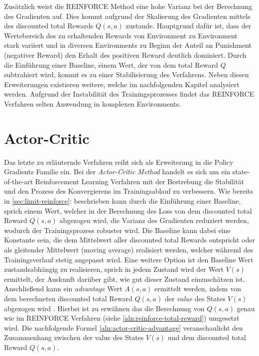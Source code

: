 \documentclass[11pt]{scrartcl}
\begin{document}
Zusätzlich weist die REINFORCE Method eine hohe Varianz bei der Berechnung des Gradienten auf.
Dies kommt aufgrund der Skalierung des Gradienten mittels des discounted total Rewards $Q(s,a)$ zustande.
Hauptgrund dafür ist, dass der Wertebereich des zu erhaltenden Rewards von Environment zu Environment
stark variiert und in diversen Environments zu Beginn der Anteil an Punishment (negativer Reward) den
Erhalt des positiven Reward deutlich dominiert. Durch die Einführung einer Baseline, einem Wert, der
von dem total Reward $Q$ subtrahiert wird, kommt es zu einer Stabilisierung des Verfahrens. Neben
diesen Erweiterungen existieren weitere, welche im nachfolgenden Kapitel analysiert werden. Aufgrund
der Instabilität des Trainingsprozesses findet das REINFORCE Verfahren selten Anwendung in komplexen
Environments.   
\newpage


\section{Actor-Critic}
Das letzte zu erläuternde Verfahren reiht sich als Erweiterung in die Policy Gradients Familie ein.
Bei der \textit{Actor-Critic Method} handelt es sich um ein state-of-the-art Reinforcement Learning
Verfahren mit der Bestrebung die Stabilität und den Prozess des Konvergierens im Trainingsablauf
zu verbessern. Wie bereits in \autoref{sec:limit-reinforce}:  beschrieben
kann durch die Einführung einer Baseline, sprich einem Wert, welcher in der Berechnung des Loss von dem
discounted total Reward $Q(s,a)$ abgezogen wird, die Varianz des Gradienten reduziert werden, wodurch
der Trainingsprozess robuster wird. Die Baseline kann dabei eine Konstante sein, die dem Mittelwert 
aller discounted total Rewards entspricht oder als gleitender Mittelwert (moving average) realisiert
werden, welcher während des Trainingsverlauf stetig angepasst wird. Eine weitere Option ist den Baseline
Wert zustandsabhängig zu realisieren, sprich in jedem Zustand wird der Wert $V(s)$ ermittelt, der Auskunft
darüber gibt, wie gut dieser Zustand einzuschätzen ist. Anschließend kann ein \textit{advantage} Wert
$A(s,a)$ ermittelt werden, indem von dem berechneten discounted total Reward $Q(s,a)$ der \textit{value}
des States $V(s)$ abgezogen wird \cite[~S.268 ff.]{L2018}. Hierbei ist zu erwähnen das die Berechnung von
$Q(s,a)$ genau wie im REINFORCE Verfahren (siehe \autoref{aln:reinforce-total-reward}) umgesetzt wird.
Die nachfolgende Formel \ref{aln:actor-critic-advantage} veranschaulicht den Zusammenhang zwischen der
value des States $V(s)$ und dem discounted total Reward $Q(s,a)$.
\end{document}
